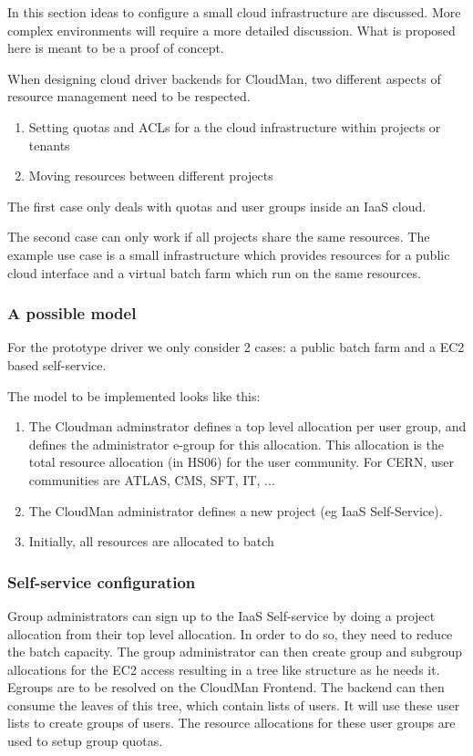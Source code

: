 In this section ideas to configure a small cloud infrastructure are discussed. More complex environments will require a more detailed discussion. What is proposed here is meant to be a proof of concept. 

When designing cloud driver backends for CloudMan, two different aspects of resource management need to be respected. 

\begin{enumerate}
\item Setting quotas and ACLs for a the cloud infrastructure within projects or tenants
\item Moving resources between different projects
\end{enumerate}

The first case only deals with quotas and user groups inside an IaaS cloud.

The second case can only work if all projects share the same resources. The example use case is a small infrastructure which provides resources for a public cloud interface and a virtual batch farm which run on the same resources. 


\subsubsection{A possible model}
For the prototype driver we only consider 2 cases: a public batch farm and a EC2 based self-service.

The model to be implemented looks like this:
\begin{enumerate}
\item The Cloudman adminstrator defines a top level allocation per user group, and defines the administrator e-group for this allocation. This allocation is the total resource allocation (in HS06) for the user community. For CERN, user communities are ATLAS, CMS, SFT, IT, ...
\item The CloudMan administrator defines a new project (eg IaaS Self-Service). 
\item Initially, all resources are allocated to batch
\end{enumerate}

\subsubsection{Self-service configuration}
Group administrators can sign up to the IaaS Self-service by doing a project allocation from their top level allocation. In order to do so, they  need to reduce the batch capacity. The group administrator can then create group and subgroup allocations for the EC2 access resulting in a tree like structure as he needs it.
Egroups are to be resolved on the CloudMan Frontend.
The backend can then consume the leaves of this tree, which contain lists of users. It will use these user lists to create groups of users. The resource allocations for these user groups are used to setup group quotas. 

